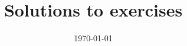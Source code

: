 \documentclass[12pt,a4paper,reqno]{amsart}
\title[Solutions to exercises]{Solutions to exercises}
\date{\today}
\theoremstyle{plain}
\theoremstyle{definition}
\theoremstyle{remark}
\begin{document}
\maketitle

\printbibliography
\vfill
\end{document}
